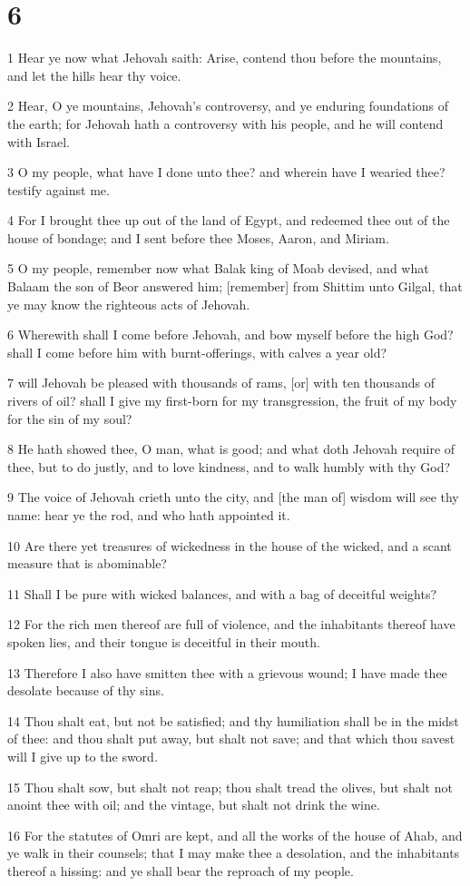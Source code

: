 \chapter{6}

\par 1 Hear ye now what Jehovah saith: Arise, contend thou before the mountains, and let the hills hear thy voice.
\par 2 Hear, O ye mountains, Jehovah's controversy, and ye enduring foundations of the earth; for Jehovah hath a controversy with his people, and he will contend with Israel.
\par 3 O my people, what have I done unto thee? and wherein have I wearied thee? testify against me.
\par 4 For I brought thee up out of the land of Egypt, and redeemed thee out of the house of bondage; and I sent before thee Moses, Aaron, and Miriam.
\par 5 O my people, remember now what Balak king of Moab devised, and what Balaam the son of Beor answered him; [remember] from Shittim unto Gilgal, that ye may know the righteous acts of Jehovah.
\par 6 Wherewith shall I come before Jehovah, and bow myself before the high God? shall I come before him with burnt-offerings, with calves a year old?
\par 7 will Jehovah be pleased with thousands of rams, [or] with ten thousands of rivers of oil? shall I give my first-born for my transgression, the fruit of my body for the sin of my soul?
\par 8 He hath showed thee, O man, what is good; and what doth Jehovah require of thee, but to do justly, and to love kindness, and to walk humbly with thy God?
\par 9 The voice of Jehovah crieth unto the city, and [the man of] wisdom will see thy name: hear ye the rod, and who hath appointed it.
\par 10 Are there yet treasures of wickedness in the house of the wicked, and a scant measure that is abominable?
\par 11 Shall I be pure with wicked balances, and with a bag of deceitful weights?
\par 12 For the rich men thereof are full of violence, and the inhabitants thereof have spoken lies, and their tongue is deceitful in their mouth.
\par 13 Therefore I also have smitten thee with a grievous wound; I have made thee desolate because of thy sins.
\par 14 Thou shalt eat, but not be satisfied; and thy humiliation shall be in the midst of thee: and thou shalt put away, but shalt not save; and that which thou savest will I give up to the sword.
\par 15 Thou shalt sow, but shalt not reap; thou shalt tread the olives, but shalt not anoint thee with oil; and the vintage, but shalt not drink the wine.
\par 16 For the statutes of Omri are kept, and all the works of the house of Ahab, and ye walk in their counsels; that I may make thee a desolation, and the inhabitants thereof a hissing: and ye shall bear the reproach of my people.

